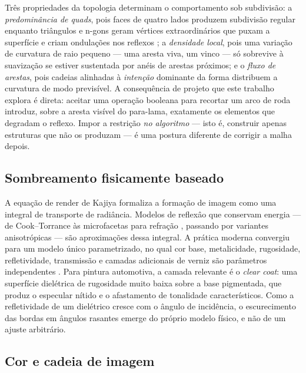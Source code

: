 Tr\^es propriedades da topologia determinam o comportamento sob subdivis\~ao: a
\emph{predomin\^ancia de quads}, pois faces de quatro lados produzem subdivis\~ao regular
enquanto tri\^angulos e n-gons geram v\'ertices extraordin\'arios que puxam a
superf\'icie e criam ondula\c{c}\~oes nos reflexos \cite{bbotsch2010}; a \emph{densidade
local}, pois uma varia\c{c}\~ao de curvatura de raio pequeno --- uma aresta viva, um
vinco --- s\'o sobrevive \`a suaviza\c{c}\~ao se estiver sustentada por an\'eis de
arestas pr\'oximos; e o \emph{fluxo de arestas}, pois cadeias alinhadas \`a
\emph{inten\c{c}\~ao} dominante da forma distribuem a curvatura de modo previs\'ivel. A
consequ\^encia de projeto que este trabalho explora \'e direta: aceitar uma
opera\c{c}\~ao booleana para recortar um arco de roda introduz, sobre a aresta vis\'ivel
do para-lama, exatamente os elementos que degradam o reflexo. Impor a restri\c{c}\~ao
\emph{no algoritmo} --- isto \'e, construir apenas estruturas que n\~ao os produzam ---
\'e uma postura diferente de corrigir a malha depois.

\subsection{Sombreamento fisicamente baseado}

A equa\c{c}\~ao de render de Kajiya \cite{kajiya1986} formaliza a forma\c{c}\~ao de imagem
como uma integral de transporte de radi\^ancia. Modelos de reflex\^ao que conservam energia
--- de Cook--Torrance \cite{cook1982} \`as microfacetas para refra\c{c}\~ao
\cite{walter2007}, passando por variantes anisotr\'opicas --- s\~ao
aproxima\c{c}\~oes dessa integral.
A pr\'atica moderna \cite{pharr2016} convergiu para um modelo \'unico parametrizado, no qual cor base,
metalicidade, rugosidade, refletividade, transmiss\~ao e camadas adicionais de verniz s\~ao
par\^ametros independentes \cite{burley2012, karis2013}. Para pintura automotiva, a
camada relevante \'e o \emph{clear coat}: uma superf\'icie diel\'etrica de rugosidade muito
baixa sobre a base pigmentada, que produz o especular n\'itido e o afastamento de
tonalidade caracter\'isticos. Como a refletividade de um diel\'etrico cresce com o
\^angulo de incid\^encia, o escurecimento das bordas em \^angulos rasantes emerge do
pr\'oprio modelo f\'isico, e n\~ao de um ajuste arbitr\'ario.

\subsection{Cor e cadeia de imagem}

